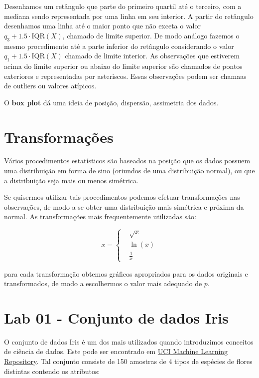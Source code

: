 \documentclass[
]{book}
\begin{document}
Desenhamos um retângulo que parte do primeiro quartil até o terceiro, com a mediana sendo representada por uma linha em seu interior. A partir do retângulo desenhamos uma linha até o maior ponto que não exceta o valor \(q_3+1.5 \cdot \text{IQR}(X)\), chamado de limite superior. De modo análogo fazemos o mesmo procedimento até a parte inferior do retângulo considerando o valor \(q_1 + 1.5 \cdot \text{IQR}(X)\) chamado de limite interior. As observações que estiverem acima do limite superior ou abaixo do limite superior são chamados de pontos exteriores e representadas por asteriscos. Essas observações podem ser chamaas de outliers ou valores atípicos.

O \textbf{box plot} dá uma ideia de posição, dispersão, assimetria dos dados.

\hypertarget{transformauxe7uxf5es}{%
\section{Transformações}\label{transformauxe7uxf5es}}

Vários procedimentos estatísticos são baseados na posição que os dados possuem uma distribuição em forma de sino (oriundos de uma distribuição normal), ou que a distribuição seja mais ou menos simétrica.

Se quisermos utilizar tais procedimentos podemos efetuar transformações nas observações, de modo a se obter uma distribuição mais simétrica e próxima da normal. As transformações mais frequentemente utilizadas são:

\[
x = \left\{\begin{matrix}&\sqrt{x}\\ &\ln(x) \\&\frac{1}{x}\end{matrix}\right.
\]

para cada transformação obtemos gráficos apropriados para os dados originais e transformados, de modo a escolhermos o valor mais adequado de \(p\).

\hypertarget{lab-01---conjunto-de-dados-iris}{%
\section{Lab 01 - Conjunto de dados Iris}\label{lab-01---conjunto-de-dados-iris}}

O conjunto de dados Iris é um dos mais utilizados quando introduzimos conceitos de ciência de dados. Este pode ser encontrado em \href{http://archive.ics.uci.edu/ml/index.php}{UCI Machine Learning Repository}. Tal conjunto consiste de 150 amostras de 4 tipos de espécies de flores distintas contendo os atributos:
\end{document}
